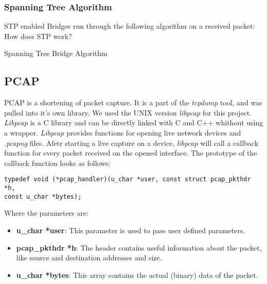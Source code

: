 \subsubsection{Spanning Tree Algorithm}
STP enabled Bridges run through the following algorithm on a received packet:
How does STP work?
\begin{algorithm}
    \DontPrintSemicolon
    \;
    
    \caption{Spanning Tree Bridge Algorithm}
\end{algorithm}
\subsection{PCAP}
PCAP is a shortening of packet capture.
It is a part of the \textit{tcpdump} tool, and was pulled into it's own library.
We used the UNIX version \textit{libpcap} for this project.
\textit{Libpcap} is a C library and can be directly linked with C and C++ whithout using a wrapper.
\textit{Libpcap} provides functions for opening live network devices and \textit{.pcapng} files.
Afetr starting a live capture on a device, \textit{libpcap} will call a callback function for every packet received on the opened interface.
The prototype of the callback function looks as follows:
\begin{lstlisting}
typedef void (*pcap_handler)(u_char *user, const struct pcap_pkthdr *h,
const u_char *bytes);
\end{lstlisting}
Where the parameters are:
\begin{itemize}
    \item \textbf{u\_char *user}: This parameter is used to pass user defined parameters.
    \item \textbf{pcap\_pkthdr *h}: The header contains useful information about the packet, like source and destination addresses and size.
    \item \textbf{u\_char *bytes}: This array contains the actual (binary) data of the packet.
\end{itemize}

